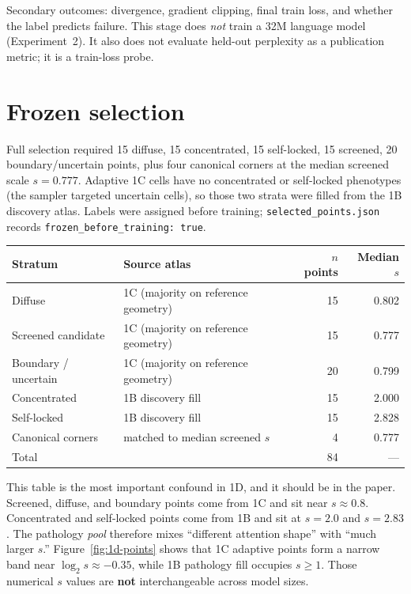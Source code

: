 \documentclass[11pt,a4paper]{report}
\begin{document}
Secondary outcomes: divergence, gradient clipping, final train loss, and whether the label predicts failure. This stage does \emph{not} train a 32M language model (Experiment~2). It also does not evaluate held-out perplexity as a publication metric; it is a train-loss probe.

\section{Frozen selection}

Full selection required 15 diffuse, 15 concentrated, 15 self-locked, 15 screened, 20 boundary/uncertain points, plus four canonical corners at the median screened scale $s=0.777$. Adaptive 1C cells have no concentrated or self-locked phenotypes (the sampler targeted uncertain cells), so those two strata were filled from the 1B discovery atlas. Labels were assigned before training; \texttt{selected\_points.json} records \texttt{frozen\_before\_training: true}.

\begin{center}
\begin{tabular}{llrr}
\toprule
Stratum & Source atlas & $n$ points & Median $s$ \\
\midrule
Diffuse & 1C (majority on reference geometry) & 15 & 0.802 \\
Screened candidate & 1C (majority on reference geometry) & 15 & 0.777 \\
Boundary / uncertain & 1C (majority on reference geometry) & 20 & 0.799 \\
Concentrated & 1B discovery fill & 15 & 2.000 \\
Self-locked & 1B discovery fill & 15 & 2.828 \\
Canonical corners & matched to median screened $s$ & 4 & 0.777 \\
\midrule
Total & & 84 & --- \\
\bottomrule
\end{tabular}
\end{center}

This table is the most important confound in 1D, and it should be in the paper. Screened, diffuse, and boundary points come from 1C and sit near $s\approx 0.8$. Concentrated and self-locked points come from 1B and sit at $s=2.0$ and $s=2.83$. The pathology \emph{pool} therefore mixes ``different attention shape'' with ``much larger $s$.'' Figure~\ref{fig:1d-points} shows that 1C adaptive points form a narrow band near $\log_2 s\approx -0.35$, while 1B pathology fill occupies $s\ge 1$. Those numerical $s$ values are \textbf{not} interchangeable across model sizes.
\end{document}

